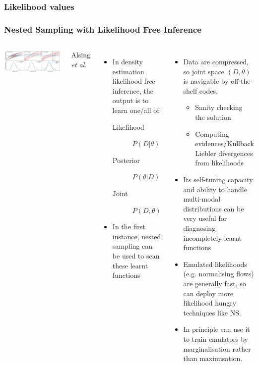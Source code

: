 \documentclass[aspectratio=169,handout]{beamer}
\begin{document}
\begin{frame}
    \frametitle{Likelihood values}
\end{frame}


\begin{frame}
    \frametitle{Nested Sampling with Likelihood Free Inference}
    \begin{columns}
        \includegraphics[width=\textwidth]{figures/three_ways_II.pdf}

        \hfill Alsing \textit{et al.}~
    \begin{itemize}
        \item In density estimation likelihood free inference, the output is to learn one/all of:
            \begin{description}
                \item[Likelihood] $P(D|\theta)$
                \item[Posterior] $P(\theta|D)$ 
                \item[Joint] $P(D,\theta)$
            \end{description}
        \item In the first instance, nested sampling can be used to scan these learnt functions
    \end{itemize}
    \begin{itemize}
        \item Data are compressed, so joint space $(D,\theta)$ is navigable by off-the-shelf codes. 
            \begin{itemize}
                \item Sanity checking the solution
                \item Computing evidences/Kullback Liebler divergences from likelihoods
            \end{itemize}
        \item Its self-tuning capacity and ability to handle multi-modal distributions can be very useful for diagnosing incompletely learnt functions
        \item Emulated likelihoods (e.g. normalising flows) are generally fast, so can deploy more likelihood hungry techniques like NS.
        \item In principle can use it to train emulators by marginalisation rather than maximisation.
    \end{itemize}
    \end{columns}
\end{frame}
\end{document}
